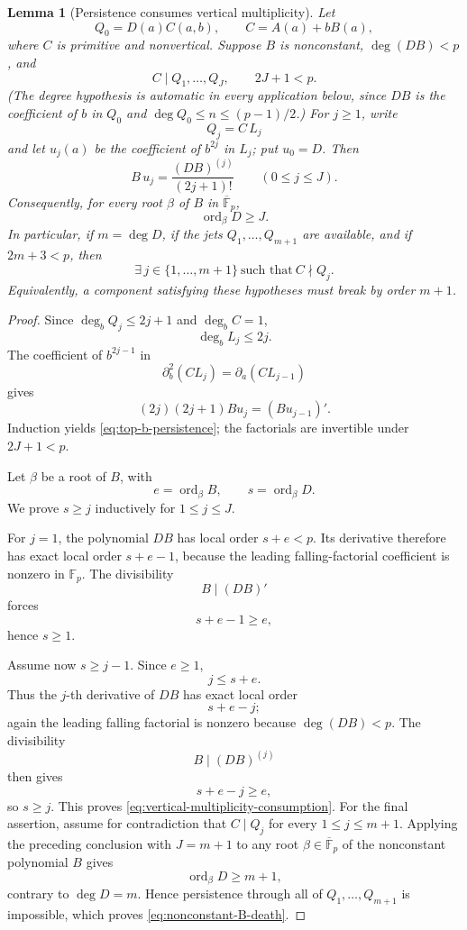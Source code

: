 \documentclass[11pt]{article}
\newtheorem{lemma}[theorem]{Lemma}
\newcommand{\F}{\mathbb F}
\begin{document}
\begin{lemma}[Persistence consumes vertical multiplicity]
\label{lem:persistence-vertical-multiplicity}
Let
\[
 Q_0=D(a)C(a,b),
 \qquad
 C=A(a)+bB(a),
\]
where \(C\) is primitive and nonvertical.  Suppose \(B\) is
nonconstant, \(\deg(DB)<p\), and
\[
 C\mid Q_1,\ldots,Q_J,
 \qquad
 2J+1<p.
\]
(The degree hypothesis is automatic in every application below, since
\(DB\) is the coefficient of \(b\) in \(Q_0\) and
\(\deg Q_0\le n\le(p-1)/2\).)
For \(j\ge1\), write
\[
 Q_j=C\,L_j
\]
and let \(u_j(a)\) be the coefficient of \(b^{2j}\) in \(L_j\);
put \(u_0=D\).  Then
\begin{equation}
 \boxed{
 B\,u_j
 =
 \frac{(DB)^{(j)}}{(2j+1)!}
 \qquad(0\le j\le J).
 }
 \label{eq:top-b-persistence}
\end{equation}
Consequently, for every root \(\beta\) of \(B\) in
\(\overline{\F}_p\),
\begin{equation}
 \operatorname{ord}_\beta D\ge J.
 \label{eq:vertical-multiplicity-consumption}
\end{equation}
In particular, if \(m=\deg D\), if the jets
\(Q_1,\ldots,Q_{m+1}\) are available, and if \(2m+3<p\), then
\begin{equation}
 \boxed{\exists\,j\in\{1,\ldots,m+1\}\ \text{such that}\ C\nmid Q_j.}
 \label{eq:nonconstant-B-death}
\end{equation}
Equivalently, a component satisfying these hypotheses must break by order
\(m+1\).
\end{lemma}

\begin{proof}
Since \(\deg_bQ_j\le2j+1\) and \(\deg_bC=1\),
\[
 \deg_bL_j\le2j.
\]
The coefficient of \(b^{2j-1}\) in
\[
 \partial_b^2(C L_j)=\partial_a(C L_{j-1})
\]
gives
\[
 (2j)(2j+1)B u_j=(B u_{j-1})'.
\]
Induction yields \eqref{eq:top-b-persistence}; the factorials are
invertible under \(2J+1<p\).

Let \(\beta\) be a root of \(B\), with
\[
 e=\operatorname{ord}_\beta B,\qquad
 s=\operatorname{ord}_\beta D.
\]
We prove \(s\ge j\) inductively for \(1\le j\le J\).

For \(j=1\), the polynomial \(DB\) has local order \(s+e<p\).
Its derivative therefore has exact local order \(s+e-1\), because the
leading falling-factorial coefficient is nonzero in \(\F_p\).
The divisibility
\[
 B\mid(DB)'
\]
forces
\[
 s+e-1\ge e,
\]
hence \(s\ge1\).

Assume now \(s\ge j-1\).  Since \(e\ge1\),
\[
 j\le s+e.
\]
Thus the \(j\)-th derivative of \(DB\) has exact local order
\[
 s+e-j;
\]
again the leading falling factorial is nonzero because
\(\deg(DB)<p\).  The divisibility
\[
 B\mid(DB)^{(j)}
\]
then gives
\[
 s+e-j\ge e,
\]
so \(s\ge j\).  This proves
\eqref{eq:vertical-multiplicity-consumption}.  For the final assertion,
assume for contradiction that \(C\mid Q_j\) for every
\(1\le j\le m+1\).  Applying the preceding conclusion with
\(J=m+1\) to any root \(\beta\in\overline{\F}_p\) of the nonconstant
polynomial \(B\) gives
\[
 \operatorname{ord}_\beta D\ge m+1,
\]
contrary to \(\deg D=m\).  Hence persistence through all of
\(Q_1,\ldots,Q_{m+1}\) is impossible, which proves
\eqref{eq:nonconstant-B-death}.
\end{proof}
\end{document}
